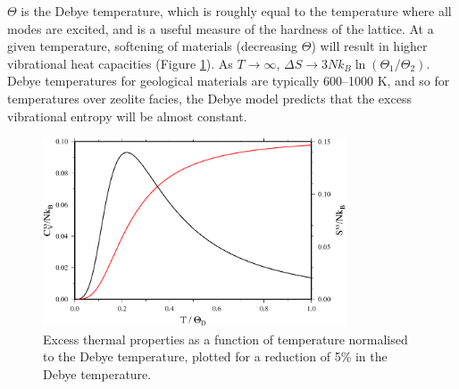 \noindent $\Theta$ is the Debye temperature, which is roughly equal to the temperature where all modes are excited, and is a useful measure of the hardness of the lattice. At a given temperature, softening of materials (decreasing $\Theta$) will result in higher vibrational heat capacities (Figure \ref{fig:debye_excesses}). As $T \rightarrow \infty$, $\Delta S \rightarrow 3Nk_B\ln (\Theta_{1} / \Theta_{2})$. Debye temperatures for geological materials are typically 600--1000 K, and so for temperatures over zeolite facies, the Debye model predicts that the excess vibrational entropy will be almost constant. %



\begin{figure}[ht!]
  \centering
  \includegraphics[width=0.8\textwidth]{figures/debye_excesses}
  \caption{Excess thermal properties as a function of temperature normalised to the Debye temperature, plotted for a reduction of 5\% in the Debye temperature.}
  \label{fig:debye_excesses}
\end{figure}



